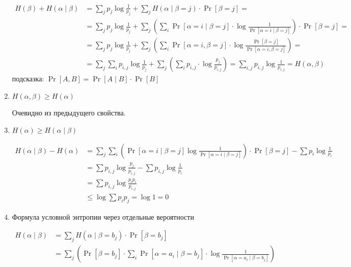 \begin{prop}
\begin{enumerate}
\begin{proof*}
		\begin{align*}
    		H( \beta ) + H( \alpha  \mid \beta ) &= \sum_j p_j \log \frac{1}{p_j} + \sum_{j} H ( \alpha  \mid \beta = j) \cdot  \Pr[\beta = j] = \\
    		&= \sum_j p_j \log \frac{1}{p_j} + \sum_{j} \left(\sum_{i}^{} \Pr[ \alpha = i \mid  \beta  = j] \cdot  \log \frac{1}{\Pr [ \alpha  = i \mid \beta  = j]}\right) \cdot  \Pr[\beta = j] = \\
		    &= \sum_j p_j \log \frac{1}{p_j} + \sum_{j} \left(\sum_{i}^{} \Pr[ \alpha = i,  \beta  = j] \cdot  \log \frac{\Pr [\beta = j]}{\Pr [ \alpha  = i,  \beta  = j]}\right) = \\
		    &= \sum_j \sum_i p_{i,j} \log \frac{1}{p_j} + \sum_{j} \left(\sum_{i}^{} p_{i,j} \cdot  \log \frac{p_j}{p_{i,j}}\right) = \sum_{i,j}p_{i,j}\log \frac{1}{p_{i,j}} = H(\alpha, \beta)
		    \end{align*}
		    подсказка: $\Pr [A, B] = \Pr[A \mid B] \cdot \Pr[B]$
		\end{proof*}
		\item $ H( \alpha , \beta ) \ge H( \alpha )$
		\begin{proof*}
		    Очевидно из предыдущего свойства.
		\end{proof*}
		\item $ H( \alpha ) \ge  H ( \alpha \mid \beta )$
			\begin{proof*}
			    \begin{align*}
    			    H( \alpha \mid \beta ) - H ( \alpha ) 
    			    &= \sum_j \sum_i\left( \Pr [\alpha = i \mid \beta = j] \log \frac{1}{ \Pr [ \alpha = i \mid \beta = j]}\right)\cdot \Pr[\beta = j] - \sum p_{i} \log \frac{1}{p_i} \\
    				&= \sum p_{i,j}\log\frac{p_j}{p_{i,j}} - \sum p_{i,j}\log\frac{1}{p_i} \\
    				&= \sum p_{i, j} \log \frac{p_i p_i}{p_{i,j}} \\
    				&\le \log \sum p_i p_j = \log 1 = 0 \tag{по неравенству Йенсена}
			    \end{align*}
			\end{proof*}
		\item Формула условной энтропии через отдельные вероятности
		    \begin{proof*}
    			\begin{align*}
    				H( \alpha \mid \beta ) 
    				&= \sum_j H(\alpha \mid \beta = b_j) \cdot \Pr[\beta = b_j] \\
    				&= \sum_{j} \left( \Pr[ \beta = b_j] \cdot  \sum_{i}^{} \Pr[ \alpha = a_i \mid \beta = b_j] \cdot \log \frac{1}{\Pr[ \alpha = a_i \mid \beta = b_j]} \right) \\

\end{align*}
\end{proof*}
\end{enumerate}
\end{prop}
